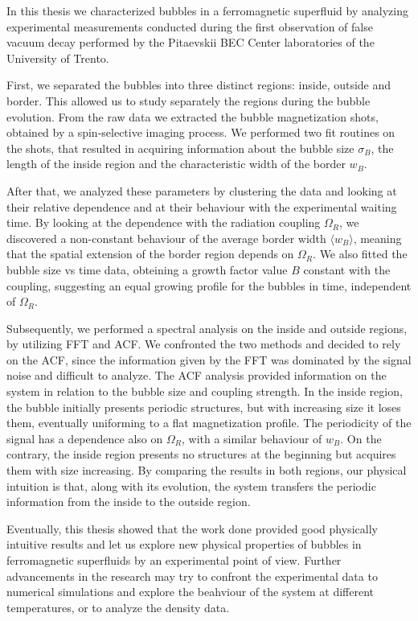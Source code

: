 In this thesis we characterized bubbles in a ferromagnetic superfluid by analyzing experimental measurements conducted during the first observation of false vacuum decay performed by the Pitaevskii BEC Center laboratories of the University of Trento. 

First, we separated the bubbles into three distinct regions: inside, outside and border. This allowed us to study separately the regions during the bubble evolution. From the raw data we extracted the bubble magnetization shots, obtained by a spin-selective imaging process. We performed two fit routines on the shots, that resulted in acquiring information about the bubble size $\sigma_B$, the length of the inside region and the characteristic width of the border $w_B$. 

After that, we analyzed these parameters by clustering the data and looking at their relative dependence and at their behaviour with the experimental waiting time. By looking at the dependence with the radiation coupling $\Omega_R$, we discovered a non-constant behaviour of the average border width $\langle w_B\rangle$, meaning that the spatial extension of the border region depends on $\Omega_R$. We also fitted the bubble size vs time data, obteining a growth factor value $B$ constant with the coupling, suggesting an equal growing profile for the bubbles in time, independent of $\Omega_R$.

Subsequently, we performed a spectral analysis on the inside and outside regions, by utilizing FFT and ACF. We confronted the two methods and decided to rely on the ACF, since the information given by the FFT was dominated by the signal noise and difficult to analyze. The ACF analysis provided information on the system in relation to the bubble size and coupling strength. In the inside region, the bubble initially presents periodic structures, but with increasing size it loses them, eventually uniforming to a flat magnetization profile. The periodicity of the signal has a dependence also on $\Omega_R$, with a similar behaviour of $w_B$. On the contrary, the inside region presents no structures at the beginning but acquires them with size increasing. By comparing the results in both regions, our physical intuition is that, along with its evolution, the system transfers the periodic information from the inside to the outside region.

Eventually, this thesis showed that the work done provided good physically intuitive results and let us explore new physical properties of bubbles in ferromagnetic superfluids by an experimental point of view. Further advancements in the research may try to confront the experimental data to numerical simulations and explore the beahviour of the system at different temperatures, or to analyze the density data.
